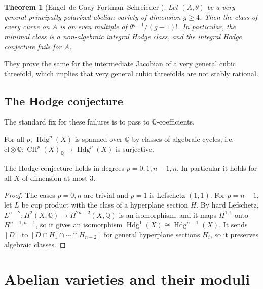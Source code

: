\documentclass[12pt]{amsart}
\newcommand{\Q}{\mathbb{Q}}
\DeclareMathOperator{\Hdg}{Hdg}
\DeclareMathOperator{\CH}{CH}
\newtheorem{theorem}{Theorem}[section]
\theoremstyle{definition}
\theoremstyle{remark}
\numberwithin{equation}{section}
\begin{document}
\begin{theorem}[Engel--de Gaay Fortman--Schreieder \cite{EdGFS25}]\label{thm:EdGFS}
    Let $(A, \theta)$ be a very general principally polarized abelian variety
    of dimension $g \geq 4$. Then the class of every curve on $A$ is an
    \emph{even} multiple of $\theta^{g-1}/(g-1)!$. In particular, the minimal
    class is a non-algebraic integral Hodge class, and the integral Hodge
    conjecture fails for $A$.
\end{theorem}

They prove the same for the intermediate Jacobian of a very general cubic
threefold, which implies that very general cubic threefolds are not stably
rational.

\subsection{The Hodge conjecture}
The standard fix for these failures is to pass to $\Q$-coefficients.

\begin{conjecture}
    For all $p$, $\Hdg^p(X)$ is spanned over $\Q$ by classes of algebraic
    cycles, i.e.\ $\mathrm{cl} \otimes \Q \colon \CH^p(X)_\Q \to \Hdg^p(X)$ is
    surjective.
\end{conjecture}

\begin{proposition}
    The Hodge conjecture holds in degrees $p = 0, 1, n-1, n$. In particular it
    holds for all $X$ of dimension at most $3$.
\end{proposition}
\begin{proof}
    The cases $p = 0, n$ are trivial and $p = 1$ is Lefschetz $(1,1)$. For
    $p = n - 1$, let $L$ be cup product with the class of a hyperplane section
    $H$. By hard Lefschetz,
    $L^{n-2} \colon H^2(X, \Q) \to H^{2n-2}(X, \Q)$ is an isomorphism, and it
    maps $H^{1,1}$ onto $H^{n-1,n-1}$, so it gives an isomorphism
    $\Hdg^1(X) \cong \Hdg^{n-1}(X)$. It sends $[D]$ to
    $[D \cap H_1 \cap \cdots \cap H_{n-2}]$ for general hyperplane sections
    $H_i$, so it preserves algebraic classes.
\end{proof}

\section{Abelian varieties and their moduli}\label{sec:AV}
\end{document}
